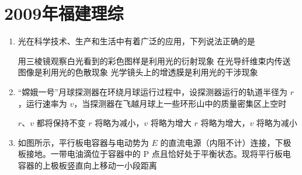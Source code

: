 \documentclass[\gkver]{gaokaozhenti}
\begin{document}
\chapter{2009年福建理综}

\begin{enumerate}
\item
光在科学技术、生产和生活中有着广泛的应用，下列说法正确的是

{用三棱镜观察白光看到的彩色图样是利用光的衍射现象}
{在光导纤维束内传送图像是利用光的色散现象}
{光学镜头上的增透膜是利用光的干涉现象}


\item
“嫦娥一号”月球探测器在环绕月球运行过程中，设探测器运行的轨道半径为 $r$，运行速率为 $v$，当探测器在飞越月球上一些环形山中的质量密集区上空时

{$r$、$v$ 都将保持不变}
{$r$ 将略为减小，$v$ 将略为增大}
{$r$ 将略为增大，$v$ 将略为减小}


\item
如图所示，平行板电容器与电动势为 $E$ 的直流电源（内阻不计）连接，下极板接地。一带电油滴位于容器中的 P 点且恰好处于平衡状态。现将平行板电容器的上极板竖直向上移动一小段距离



\end{enumerate}
\end{document}

